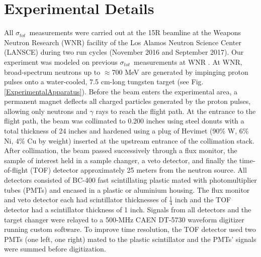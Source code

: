 \documentclass[twocolumn,secnumarabic,amssymb, nobibnotes, aps, prl,
superscriptaddress, nobalancelastpage]{revtex4}
\newcommand{\tot}{\ensuremath{\sigma_{tot}}}
\begin{document}
\section{Experimental Details}
All \tot\ measurements were carried out at the 15R
beamline at the Weapons Neutron Research (WNR) facility of the Los Alamos
Neutron Science Center (LANSCE) during two run cycles (November 2016 and
September 2017). Our experiment was modeled on previous
\tot\ measurements at WNR \cite{Finlay1993,Abfalterer2001,Shane2010}.
At WNR,
broad-spectrum neutrons up
to $\approx$700 MeV are generated by impinging proton pulses onto a water-cooled, 7.5
cm-long tungsten target (see Fig. \ref{ExperimentalApparatus}). Before the beam
enters the experimental area, a
permanent magnet deflects all charged particles generated by the proton pulses, 
allowing only neutrons and $\gamma$ rays to reach the flight path. At the
entrance to the flight path, the beam was collimated to 0.200 inches using steel
donuts with a total thickness of 24 inches and hardened using a plug of Hevimet (90\% W, 6\% 
Ni, 4\% Cu by weight) inserted at the upstream entrance of the
collimation stack. After collimation, the beam passed successively through a flux 
monitor, the sample of interest held in a sample changer, a veto detector, and finally the 
time-of-flight (TOF) detector approximately 25 meters from the neutron source.
All detectors consisted of BC-400 fast scintillating plastic mated with 
photomultiplier tubes (PMTs) and encased in a plastic or
aluminium housing. The flux monitor and veto detector each had
scintillator thicknesses of $\frac{1}{4}$ inch and the TOF detector had a
scintillator thickness of 1 inch. Signals from all detectors and
the target changer were relayed to a 500-MHz CAEN DT-5730 waveform digitizer
running custom software. To improve time resolution, the TOF detector used two
PMTs (one left, one right) mated to the plastic scintillator and the PMTs' signals were 
summed before digitization.
\end{document}
